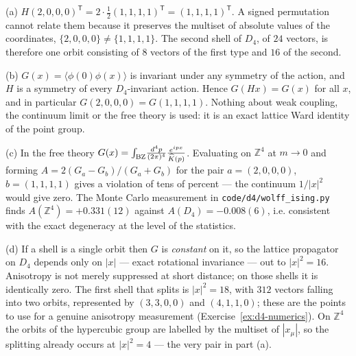 {(a) $H(2,0,0,0)^\mathsf{T} = 2\cdot\tfrac12(1,1,1,1)^\mathsf{T}=(1,1,1,1)^\mathsf{T}$.
A signed permutation cannot relate them because it preserves the multiset of
absolute values of the coordinates, $\{2,0,0,0\}\neq\{1,1,1,1\}$. The second
shell of $D_4$, of $24$ vectors, is therefore one orbit consisting of $8$
vectors of the first type and $16$ of the second.

(b) $G(x)=\langle\phi(0)\phi(x)\rangle$ is invariant under any symmetry of the
action, and $H$ is a symmetry of every $D_4$-invariant action. Hence
$G(Hx)=G(x)$ for all $x$, and in particular $G(2,0,0,0)=G(1,1,1,1)$. Nothing
about weak coupling, the continuum limit or the free theory is used: it is an
exact lattice Ward identity of the point group.

(c) In the free theory $G(x)=\int_{\rm BZ}\!\frac{d^4p}{(2\pi)^4}
\frac{e^{ipx}}{\widehat{K}(p)}$. Evaluating on $\mathbb{Z}^4$ at $m\to0$ and
forming $A = 2(G_a-G_b)/(G_a+G_b)$ for the pair
$a=(2,0,0,0)$, $b=(1,1,1,1)$ gives a violation of tens of percent --- the
continuum $1/|x|^2$ would give zero. The Monte Carlo measurement in
\texttt{code/d4/wolff\_ising.py} finds $A(\mathbb{Z}^4)=+0.331(12)$ against
$A(D_4)=-0.008(6)$, i.e. consistent with the exact degeneracy at the level of
the statistics.

(d) If a shell is a single orbit then $G$ is \emph{constant} on it, so the
lattice propagator on $D_4$ depends only on $|x|$ --- exact rotational
invariance --- out to $|x|^2=16$. Anisotropy is not merely suppressed at short
distance; on those shells it is identically zero. The first shell that splits
is $|x|^2=18$, with $312$ vectors falling into two orbits, represented by
$(3,3,0,0)$ and $(4,1,1,0)$; these are the points to use for a genuine
anisotropy measurement (Exercise~\ref{ex:d4-numerics}). On $\mathbb{Z}^4$ the
orbits of the hypercubic group are labelled by the multiset of $|x_\mu|$, so the
splitting already occurs at $|x|^2=4$ --- the very pair in part (a).}


